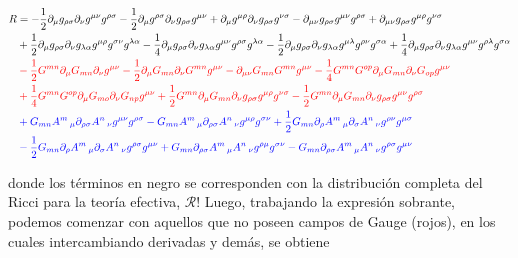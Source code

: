 \documentclass{article}
\numberwithin{equation}{section}
\begin{document}
\begin{equation}\label{R}
\begin{aligned}
R &= - \frac{1}{2}\partial_{\mu}{g_{\rho \sigma}} \partial_{\nu}{g^{\mu \nu}} g^{\rho \sigma} - \frac{1}{2}\partial_{\mu}{g^{\rho \sigma}} \partial_{\nu}{g_{\rho \sigma}} g^{\mu \nu}+\partial_{\mu}{g^{\mu \rho}} \partial_{\nu}{g_{\rho \sigma}} g^{\nu \sigma} -\partial_{\mu \nu}{g_{\rho \sigma}} g^{\mu \nu} g^{\rho \sigma} +\partial_{\mu \nu}{g_{\rho \sigma}} g^{\mu \rho} g^{\nu \sigma}\\
& +\frac{1}{2}\partial_{\mu}{g_{\rho \sigma}} \partial_{\nu}{g_{\lambda \alpha}} g^{\mu \rho} g^{\sigma \nu} g^{\lambda \alpha} - \frac{1}{4}\partial_{\mu}{g_{\rho \sigma}} \partial_{\nu}{g_{\lambda \alpha}} g^{\mu \nu} g^{\rho \sigma} g^{\lambda \alpha} - \frac{1}{2}\partial_{\mu}{g_{\rho \sigma}} \partial_{\nu}{g_{\lambda \alpha}} g^{\mu \lambda} g^{\rho \nu} g^{\sigma \alpha}+\frac{1}{4}\partial_{\mu}{g_{\rho \sigma}} \partial_{\nu}{g_{\lambda \alpha}} g^{\mu \nu} g^{\rho \lambda} g^{\sigma \alpha} \\
& \color{red} - \frac{1}{2}G^{m n} \partial_{\mu}{G_{m n}} \partial_{\nu}{g^{\mu \nu}} - \frac{1}{2}\partial_{\mu}{G_{m n}} \partial_{\nu}{G^{m n}} g^{\mu \nu} -\partial_{\mu \nu}{G_{m n}} G^{m n} g^{\mu \nu} - \frac{1}{4}G^{m n} G^{o p} \partial_{\mu}{G_{m n}} \partial_{\nu}{G_{o p}} g^{\mu \nu}\\
& \color{red} +\frac{1}{4}G^{m n} G^{o p} \partial_{\mu}{G_{m o}} \partial_{\nu}{G_{n p}} g^{\mu \nu}+\frac{1}{2}G^{m n} \partial_{\mu}{G_{m n}} \partial_{\nu}{g_{\rho \sigma}} g^{\mu \rho} g^{\nu \sigma} - \frac{1}{2}G^{m n} \partial_{\mu}{G_{m n}} \partial_{\nu}{g_{\rho \sigma}} g^{\mu \nu} g^{\rho \sigma}\\
& \color{blue} + G_{m n} A^{m}\,_{\mu} \partial_{\rho \sigma}{A^{n}\,_{\nu}} g^{\mu \nu} g^{\rho \sigma} -G_{m n} A^{m}\,_{\mu} \partial_{\rho \sigma}{A^{n}\,_{\nu}} g^{\mu \rho} g^{\sigma \nu}+\frac{1}{2}G_{m n} \partial_{\rho}{A^{m}\,_{\mu}} \partial_{\sigma}{A^{n}\,_{\nu}} g^{\rho \nu} g^{\mu \sigma}\\
& \color{blue} - \frac{1}{2}G_{m n} \partial_{\rho}{A^{m}\,_{\mu}} \partial_{\sigma}{A^{n}\,_{\nu}} g^{\rho \sigma} g^{\mu \nu}+G_{m n} \partial_{\rho \sigma}{A^{m}\,_{\mu}} A^{n}\,_{\nu} g^{\rho \mu} g^{\sigma \nu} -G_{m n} \partial_{\rho \sigma}{A^{m}\,_{\mu}} A^{n}\,_{\nu} g^{\rho \sigma} g^{\mu \nu}
\end{aligned}
\end{equation}

donde los términos en negro se corresponden con la distribución completa del Ricci para la teoría efectiva, $ \mathcal{R} $! Luego, trabajando la expresión sobrante, podemos comenzar con aquellos que no poseen campos de Gauge (rojos), en los cuales intercambiando derivadas y demás, se obtiene
\end{document}
